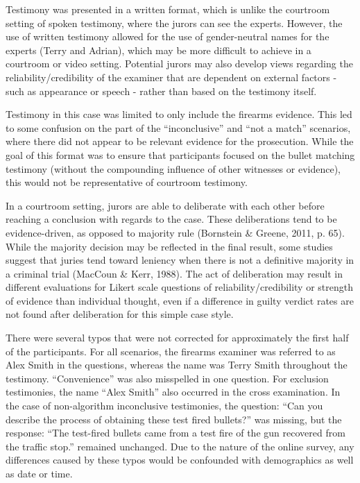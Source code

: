 \documentclass[print]{nuthesis}
\begin{document}
Testimony was presented in a written format, which is unlike the courtroom setting of spoken testimony, where the jurors can see the experts.
However, the use of written testimony allowed for the use of gender-neutral names for the experts (Terry and Adrian), which may be more difficult to achieve in a courtroom or video setting.
Potential jurors may also develop views regarding the reliability/credibility of the examiner that are dependent on external factors - such as appearance or speech - rather than based on the testimony itself.

Testimony in this case was limited to only include the firearms evidence.
This led to some confusion on the part of the ``inconclusive'' and ``not a match'' scenarios, where there did not appear to be relevant evidence for the prosecution.
While the goal of this format was to ensure that participants focused on the bullet matching testimony (without the compounding influence of other witnesses or evidence), this would not be representative of courtroom testimony.

In a courtroom setting, jurors are able to deliberate with each other before reaching a conclusion with regards to the case.
These deliberations tend to be evidence-driven, as opposed to majority rule (Bornstein \& Greene, 2011, p. 65).
While the majority decision may be reflected in the final result, some studies suggest that juries tend toward leniency when there is not a definitive majority in a criminal trial (MacCoun \& Kerr, 1988).
The act of deliberation may result in different evaluations for Likert scale questions of reliability/credibility or strength of evidence than individual thought, even if a difference in guilty verdict rates are not found after deliberation for this simple case style.

There were several typos that were not corrected for approximately the first half of the participants.
For all scenarios, the firearms examiner was referred to as Alex Smith in the questions, whereas the name was Terry Smith throughout the testimony.
``Convenience'' was also misspelled in one question.
For exclusion testimonies, the name ``Alex Smith'' also occurred in the cross examination.
In the case of non-algorithm inconclusive testimonies, the question: ``Can you describe the process of obtaining these test fired bullets?'' was missing, but the response: ``The test-fired bullets came from a test fire of the gun recovered from the traffic stop.'' remained unchanged.
Due to the nature of the online survey, any differences caused by these typos would be confounded with demographics as well as date or time.
\end{document}
